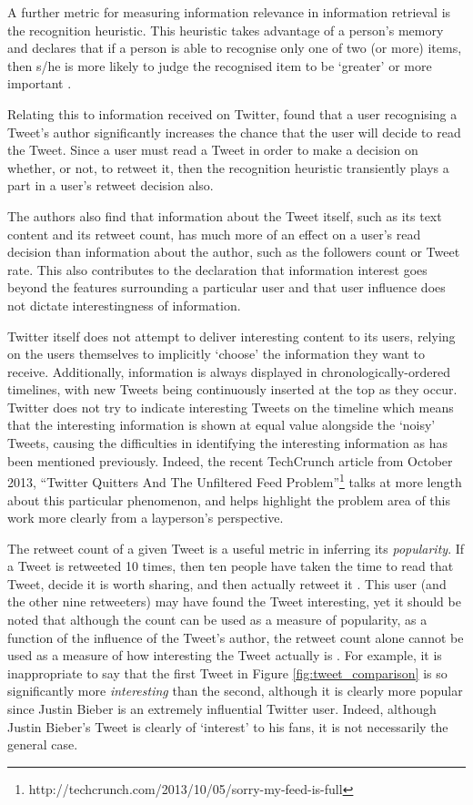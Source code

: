 A further metric for measuring information relevance in information retrieval is the recognition heuristic. This heuristic takes advantage of a person's memory and declares that if a person is able to recognise only one of two (or more) items, then s/he is more likely to judge the recognised item to be `greater' or more important \cite{oppenheimer03, goldstein99}.

Relating this to information received on Twitter, \citet{chorley12} found that a user recognising a Tweet's author significantly increases the chance that the user will decide to read the Tweet. Since a user must read a Tweet in order to make a decision on whether, or not, to retweet it, then the recognition heuristic transiently plays a part in a user's retweet decision also.

The authors also find that information about the Tweet itself, such as its text content and its retweet count, has much more of an effect on a user's read decision than information about the author, such as the followers count or Tweet rate. This also contributes to the declaration that information interest goes beyond the features surrounding a particular user and that user influence does not dictate interestingness of information.

Twitter itself does not attempt to deliver interesting content to its users, relying on the users themselves to implicitly `choose' the information they want to receive. Additionally, information is always displayed in chronologically-ordered timelines, with new Tweets being continuously inserted at the top as they occur. Twitter does not try to indicate interesting Tweets on the timeline which means that the interesting information is shown at equal value alongside the `noisy' Tweets, causing the difficulties in identifying the interesting information as has been mentioned previously. Indeed, the recent TechCrunch article from October 2013, ``Twitter Quitters And The Unfiltered Feed Problem''\footnote{http://techcrunch.com/2013/10/05/sorry-my-feed-is-full} talks at more length about this particular phenomenon, and helps highlight the problem area of this work more clearly from a layperson's perspective.

The retweet count of a given Tweet is a useful metric in inferring its \textit{popularity}. If a Tweet is retweeted 10 times, then ten people have taken the time to read that Tweet, decide it is worth sharing, and then actually retweet it \cite{uysal11}. This user (and the other nine retweeters) may have found the Tweet interesting, yet it should be noted that although the count can be used as a measure of popularity, as a function of the influence of the Tweet's author, the retweet count alone cannot be used as a measure of how interesting the Tweet actually is \cite{naveed11}. For example, it is inappropriate to say that the first Tweet in Figure \ref{fig:tweet_comparison} is so significantly more \textit{interesting} than the second, although it is clearly more popular since Justin Bieber is an extremely influential Twitter user. Indeed, although Justin Bieber's Tweet is clearly of `interest' to his fans, it is not necessarily the general case. 

